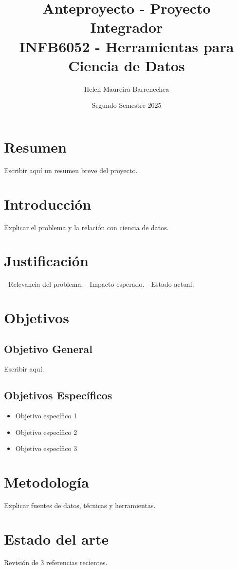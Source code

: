 \documentclass[12pt,a4paper]{article}
\title{Anteproyecto - Proyecto Integrador \\
\large INFB6052 - Herramientas para Ciencia de Datos}
\author{Helen Maureira Barrenechea}
\date{Segundo Semestre 2025}
\begin{document}
\maketitle
\thispagestyle{empty}
\newpage

\section*{Resumen}
Escribir aquí un resumen breve del proyecto.

\newpage
\section{Introducción}
Explicar el problema y la relación con ciencia de datos.

\section{Justificación}
- Relevancia del problema.  
- Impacto esperado.  
- Estado actual.  

\section{Objetivos}
\subsection{Objetivo General}
Escribir aquí.

\subsection{Objetivos Específicos}
\begin{itemize}
    \item Objetivo específico 1
    \item Objetivo específico 2
    \item Objetivo específico 3
\end{itemize}

\section{Metodología}
Explicar fuentes de datos, técnicas y herramientas.

\section{Estado del arte}
Revisión de 3 referencias recientes.  
\end{document}
